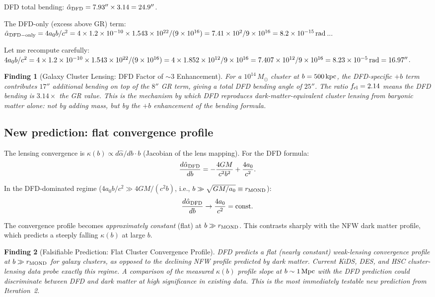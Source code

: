 \documentclass[11pt]{article}
\newtheorem{finding}{Finding}
\newcommand{\ee}[1]{\times 10^{#1}}
\begin{document}
DFD total bending: $\hat\alpha_{\rm DFD} = 7.93''\times 3.14 = 24.9''$.

The DFD-only (excess above GR) term: $\hat\alpha_{\rm DFD-only}
= 4a_0 b/c^2 = 4\times 1.2\ee{-10}\times 1.543\ee{22}/(9\ee{16})
= 7.41\ee{2}/9\ee{16} = 8.2\ee{-15}\,{\rm rad}$...

Let me recompute carefully:
$4a_0 b/c^2 = 4\times 1.2\ee{-10}\times 1.543\ee{22}/(9\ee{16})
= 4\times 1.852\ee{12}/9\ee{16} = 7.407\ee{12}/9\ee{16}
= 8.23\ee{-5}\,{\rm rad} = 16.97''$.

\begin{finding}[Galaxy Cluster Lensing: DFD Factor of $\sim 3$ Enhancement]
For a $10^{14}\,M_\odot$ cluster at $b = 500\,{\rm kpc}$, the
DFD-specific $+b$ term contributes $17''$ additional bending on top
of the $8''$ GR term, giving a total DFD bending angle of $25''$.
The ratio $f_{\rm cl} = 2.14$ means the DFD bending is $3.14\times$
the GR value.  This is the mechanism by which DFD reproduces
dark-matter-equivalent cluster lensing from baryonic matter alone:
not by adding mass, but by the $+b$ enhancement of the bending formula.
\end{finding}

\subsection{New prediction: flat convergence profile}

The lensing convergence is $\kappa(b) \propto d\hat\alpha/db\cdot b$
(Jacobian of the lens mapping).  For the DFD formula:
\begin{equation}
  \frac{d\hat\alpha_{\rm DFD}}{db} = -\frac{4GM}{c^2 b^2} + \frac{4a_0}{c^2}.
\end{equation}

In the DFD-dominated regime ($4a_0 b/c^2 \gg 4GM/(c^2 b)$, i.e.,
$b \gg \sqrt{GM/a_0} \equiv r_{\rm MOND}$):
\begin{equation}
  \frac{d\hat\alpha_{\rm DFD}}{db} \to \frac{4a_0}{c^2} = {\rm const}.
\end{equation}

The convergence profile becomes \emph{approximately constant} (flat) at
$b \gg r_{\rm MOND}$.  This contrasts sharply with the NFW dark matter
profile, which predicts a steeply falling $\kappa(b)$ at large $b$.

\begin{finding}[Falsifiable Prediction: Flat Cluster Convergence Profile]
DFD predicts a flat (nearly constant) weak-lensing convergence
profile at $b \gg r_{\rm MOND}$ for galaxy clusters, as opposed to
the declining NFW profile predicted by dark matter.  Current KiDS,
DES, and HSC cluster-lensing data probe exactly this regime.  A
comparison of the measured $\kappa(b)$ profile slope at $b \sim 1\,{\rm Mpc}$
with the DFD prediction could discriminate between DFD and dark matter
at high significance in existing data.  This is the most immediately
testable new prediction from Iteration~2.
\end{finding}
\end{document}
